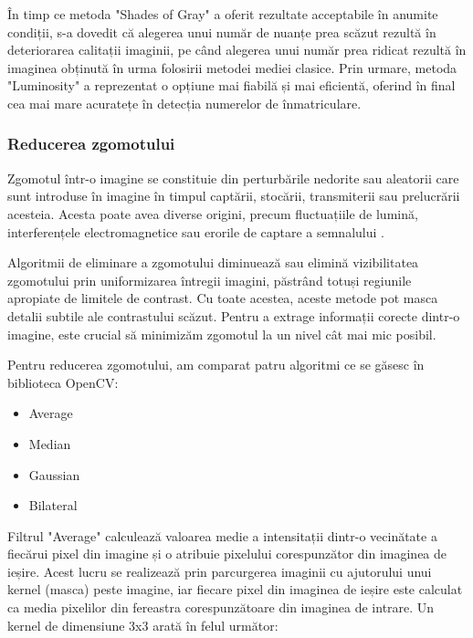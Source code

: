 \documentclass[12pt]{article}
\begin{document}
\^{I}n timp ce metoda "Shades of Gray" a oferit rezultate acceptabile \^{i}n anumite condiții, s-a dovedit c\u{a} alegerea unui num\u{a}r de nuanțe prea sc\u{a}zut rezult\u{a} \^{i}n deteriorarea calitații imaginii, pe c\^{a}nd alegerea unui num\u{a}r prea ridicat rezult\u{a} \^{i}n imaginea obținut\u{a} \^{i}n urma folosirii metodei mediei clasice. Prin urmare, metoda "Luminosity" a reprezentat o opțiune mai fiabil\u{a} și mai eficient\u{a}, oferind \^{i}n final cea mai mare acuratețe \^{i}n detecția numerelor de \^{i}nmatriculare.

\subsubsection{Reducerea zgomotului}

Zgomotul \^{i}ntr-o imagine se constituie din perturb\u{a}rile nedorite sau aleatorii care sunt introduse \^{i}n imagine \^{i}n timpul capt\u{a}rii, stoc\u{a}rii, transmiterii sau prelucr\u{a}rii acesteia. Acesta poate avea diverse origini, precum fluctuațiile de lumin\u{a}, interferențele electromagnetice sau erorile de captare a semnalului \cite{filtering}.

Algoritmii de eliminare a zgomotului diminueaz\u{a} sau elimin\u{a} vizibilitatea zgomotului prin uniformizarea \^{i}ntregii imagini, p\u{a}str\^{a}nd totuși regiunile apropiate de limitele de contrast. Cu toate acestea, aceste metode pot masca detalii subtile ale contrastului sc\u{a}zut. Pentru a extrage informații corecte dintr-o imagine, este crucial să minimizăm zgomotul la un nivel cât mai mic posibil.

Pentru reducerea zgomotului, am comparat patru algoritmi ce se g\u{a}sesc \^{i}n biblioteca OpenCV:
\begin{itemize}
    \item Average
    \item Median
    \item Gaussian
    \item Bilateral
\end{itemize}

Filtrul "Average" calculeaz\u{a} valoarea medie a intensitații dintr-o vecin\u{a}tate a fiec\u{a}rui pixel din imagine și o atribuie pixelului corespunz\u{a}tor din imaginea de ieșire. Acest lucru se realizeaz\u{a} prin parcurgerea imaginii cu ajutorului unui kernel (masca) peste imagine, iar fiecare pixel din imaginea de ieșire este calculat ca media pixelilor din fereastra corespunz\u{a}toare din imaginea de intrare. Un kernel de dimensiune 3x3 arat\u{a} \^{i}n felul urm\u{a}tor:
\end{document}
